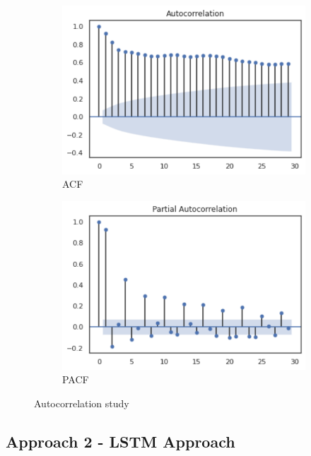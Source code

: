 \begin{figure}[h]
\centering

    \begin{subfigure}{0.49\textwidth}
    \centering
    \includegraphics[width=\linewidth]{figures/Ch4/Trend_autocorr.pdf}
    \caption{ACF}
    \label{f:auto}
    \end{subfigure}
\hfill
    \begin{subfigure}{0.49\textwidth}
    \centering
    \includegraphics[width=\linewidth]{figures/Ch4/Trend_Partial_autocorr.pdf}
    \caption{PACF}
    \label{f:partial}
    \end{subfigure}

\caption{Autocorrelation study}
\label{f:autocorrelation}
\end{figure}

\subsection{Approach 2 - LSTM Approach}
\label{s:Approach2}

